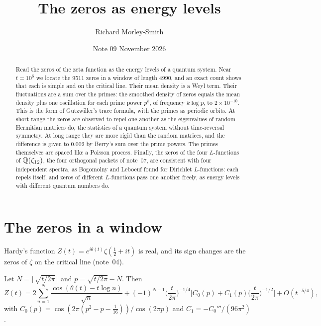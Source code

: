 \documentclass[11pt]{article}
\title{The zeros as energy levels}
\author{Richard Morley-Smith}
\date{Note 09 \quad November 2026}
\begin{document}
\maketitle

\begin{abstract}
\noindent
Read the zeros of the zeta function as the energy levels of a quantum system.
Near $t = 10^6$ we locate the 9511 zeros in a window of length 4990, and an exact count shows that each is simple and on the critical line.
Their mean density is a Weyl term.
Their fluctuations are a sum over the primes: the smoothed density of zeros equals the mean density plus one oscillation for each prime power $p^k$, of frequency $k\log p$, to $2\times10^{-10}$.
This is the form of Gutzwiller's trace formula, with the primes as periodic orbits.
At short range the zeros are observed to repel one another as the eigenvalues of random Hermitian matrices do, the statistics of a quantum system without time-reversal symmetry.
At long range they are more rigid than the random matrices, and the difference is given to $0.002$ by Berry's sum over the prime powers.
The primes themselves are spaced like a Poisson process.
Finally, the zeros of the four $L$-functions of $\mathbb{Q}(\zeta_{12})$, the four orthogonal packets of note~07, are consistent with four independent spectra, as Bogomolny and Leboeuf found for Dirichlet $L$-functions: each repels itself, and zeros of different $L$-functions pass one another freely, as energy levels with different quantum numbers do.
\end{abstract}

\section{The zeros in a window}

Hardy's function $Z(t) = e^{i\theta(t)}\zeta(\tfrac12+it)$ is real, and its sign changes are the zeros of $\zeta$ on the critical line (note~04).

\begin{derivation}\label{d:rs}
Let $N = \lfloor\sqrt{t/2\pi}\rfloor$ and $p = \sqrt{t/2\pi} - N$. Then
\[
  Z(t) = 2\sum_{n=1}^{N}\frac{\cos(\theta(t) - t\log n)}{\sqrt n}
  + (-1)^{N-1}\Big(\frac{t}{2\pi}\Big)^{-1/4}\Big[C_0(p) + C_1(p)\Big(\frac{t}{2\pi}\Big)^{-1/2}\Big] + O(t^{-5/4}),
\]
with $C_0(p) = \cos(2\pi(p^2-p-\tfrac1{16}))/\cos(2\pi p)$ and $C_1 = -C_0'''/(96\pi^2)$ \cite{Edwards}.
\end{derivation}
\end{document}
